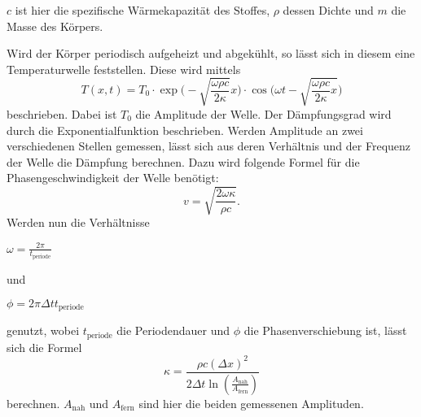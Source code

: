 $c$ ist hier die spezifische Wärmekapazität des Stoffes, $\rho$ dessen Dichte und $m$ die Masse des Körpers.

Wird der Körper periodisch aufgeheizt und abgekühlt, so lässt sich in diesem eine Temperaturwelle feststellen.
Diese wird mittels
\begin{equation}
\label{eqn:term-welle}
    T(x, t) = T_0 \cdot \exp \bigg( -\sqrt{\frac{\omega \rho c}{2 \kappa}} x \bigg) \cdot \cos\bigg( \omega t - \sqrt{\frac{\omega \rho c}{2 \kappa} x} \bigg)
\end{equation}
beschrieben. Dabei ist $T_0$ die Amplitude der Welle. Der Dämpfungsgrad wird durch die Exponentialfunktion beschrieben.
Werden Amplitude an zwei verschiedenen Stellen gemessen, lässt sich aus deren Verhältnis und der Frequenz der Welle die Dämpfung berechnen.
Dazu wird folgende Formel für die Phasengeschwindigkeit der Welle benötigt:
\begin{equation}
\label{eqn:phasengeschwindigkeit}
    v = \sqrt{\frac{2 \omega \kappa}{\rho c}}  .
\end{equation}
Werden nun die Verhältnisse 

\centerline{$\omega = \frac{2 \pi}{t_\text{periode}}$}

und

\centerline{$\phi = {2 \pi \Delta t}{t_\text{periode}}$}

genutzt, wobei $t_\text{periode}$ die Periodendauer und $\phi$ die Phasenverschiebung ist, lässt sich die Formel
\begin{equation}
\label{eqn:leitfaehigkeit}
    \kappa = \frac{\rho c (\Delta x)^2}{2 \Delta t \ln (\frac{A_\text{nah}}{A_\text{fern}})}
\end{equation}
berechnen. $A_\text{nah}$ und $A_\text{fern}$ sind hier die beiden gemessenen Amplituden.